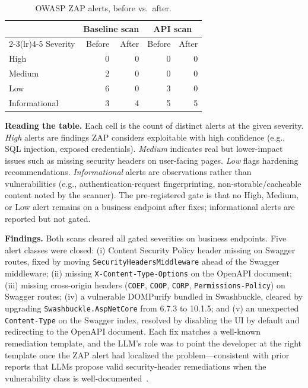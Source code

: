 \documentclass[conference]{IEEEtran}
\begin{document}
\begin{table}[t]
\caption{OWASP ZAP alerts, before vs.\ after.}
\label{tab:zap}
\centering
\begin{tabular}{lrrrr}
\toprule
 & \multicolumn{2}{c}{Baseline scan} & \multicolumn{2}{c}{API scan} \\
\cmidrule(lr){2-3}\cmidrule(lr){4-5}
Severity & Before & After & Before & After \\
\midrule
High          & 0 & 0 & 0 & 0 \\
Medium        & 2 & 0 & 0 & 0 \\
Low           & 6 & 0 & 3 & 0 \\
Informational & 3 & 4 & 5 & 5 \\
\bottomrule
\end{tabular}
\end{table}

\textbf{Reading the table.} Each cell is the count of distinct alerts at the given severity. \emph{High} alerts are findings ZAP considers exploitable with high confidence (e.g., SQL injection, exposed credentials). \emph{Medium} indicates real but lower-impact issues such as missing security headers on user-facing pages. \emph{Low} flags hardening recommendations. \emph{Informational} alerts are observations rather than vulnerabilities (e.g., authentication-request fingerprinting, non-storable/cacheable content noted by the scanner). The pre-registered gate is that no High, Medium, or Low alert remains on a business endpoint after fixes; informational alerts are reported but not gated.

\textbf{Findings.} Both scans cleared all gated severities on business endpoints. Five alert classes were closed: (i) Content Security Policy header missing on Swagger routes, fixed by moving \texttt{SecurityHeadersMiddleware} ahead of the Swagger middleware; (ii) missing \texttt{X-Content-Type-Options} on the OpenAPI document; (iii) missing cross-origin headers (\texttt{COEP}, \texttt{COOP}, \texttt{CORP}, \texttt{Permissions-Policy}) on Swagger routes; (iv) a vulnerable DOMPurify bundled in Swashbuckle, cleared by upgrading \texttt{Swashbuckle.AspNetCore} from 6.7.3 to 10.1.5; and (v) an unexpected \texttt{Content-Type} on the Swagger index, resolved by disabling the UI by default and redirecting to the OpenAPI document. Each fix matches a well-known remediation template, and the LLM's role was to point the developer at the right template once the ZAP alert had localized the problem---consistent with prior reports that LLMs propose valid security-header remediations when the vulnerability class is well-documented~\cite{ref7,ref11}.
\end{document}

